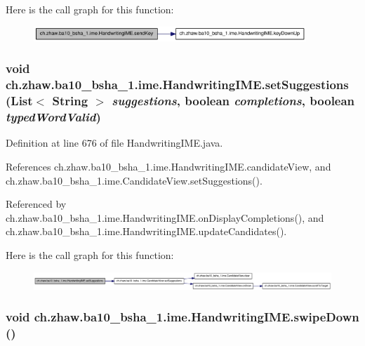 Here is the call graph for this function:\nopagebreak
\begin{figure}[H]
\begin{center}
\leavevmode
\includegraphics[width=291pt]{classch_1_1zhaw_1_1ba10__bsha__1_1_1ime_1_1HandwritingIME_a2711e357f6251b532e7d0bde79cadfdf_cgraph}
\end{center}
\end{figure}
\hypertarget{classch_1_1zhaw_1_1ba10__bsha__1_1_1ime_1_1HandwritingIME_a761d3a5ee4b8830684c9fe03641b6a62}{
\subsubsection[{setSuggestions}]{\setlength{\rightskip}{0pt plus 5cm}void ch.zhaw.ba10\_\-bsha\_\-1.ime.HandwritingIME.setSuggestions (List$<$ String $>$ {\em suggestions}, \/  boolean {\em completions}, \/  boolean {\em typedWordValid})}}
\label{classch_1_1zhaw_1_1ba10__bsha__1_1_1ime_1_1HandwritingIME_a761d3a5ee4b8830684c9fe03641b6a62}


Definition at line 676 of file HandwritingIME.java.

References ch.zhaw.ba10\_\-bsha\_\-1.ime.HandwritingIME.candidateView, and ch.zhaw.ba10\_\-bsha\_\-1.ime.CandidateView.setSuggestions().

Referenced by ch.zhaw.ba10\_\-bsha\_\-1.ime.HandwritingIME.onDisplayCompletions(), and ch.zhaw.ba10\_\-bsha\_\-1.ime.HandwritingIME.updateCandidates().

Here is the call graph for this function:\nopagebreak
\begin{figure}[H]
\begin{center}
\leavevmode
\includegraphics[width=420pt]{classch_1_1zhaw_1_1ba10__bsha__1_1_1ime_1_1HandwritingIME_a761d3a5ee4b8830684c9fe03641b6a62_cgraph}
\end{center}
\end{figure}
\hypertarget{classch_1_1zhaw_1_1ba10__bsha__1_1_1ime_1_1HandwritingIME_aa35f0cbc95d0b5623c29229e3a8ee2e5}{
\subsubsection[{swipeDown}]{\setlength{\rightskip}{0pt plus 5cm}void ch.zhaw.ba10\_\-bsha\_\-1.ime.HandwritingIME.swipeDown ()}}
\label{classch_1_1zhaw_1_1ba10__bsha__1_1_1ime_1_1HandwritingIME_aa35f0cbc95d0b5623c29229e3a8ee2e5}


